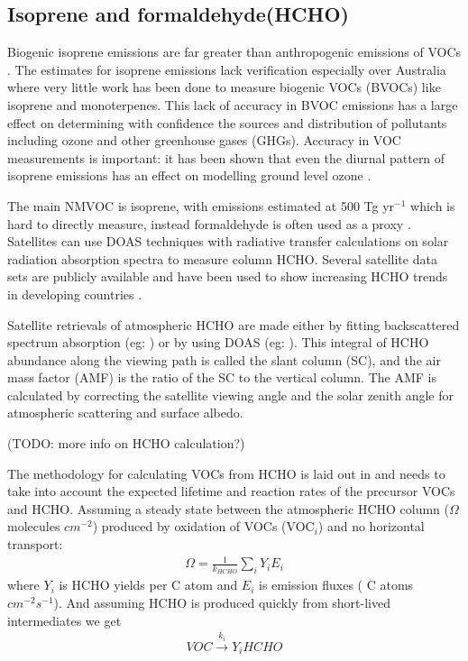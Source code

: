 \subsection{Isoprene and formaldehyde(HCHO)}

Biogenic isoprene emissions are far greater than anthropogenic emissions of VOCs \cite{Guenther_2006}. 
The estimates for isoprene emissions lack verification especially over Australia where very little work has been done to measure biogenic VOCs (BVOCs) like isoprene and monoterpenes.
This lack of accuracy in BVOC emissions has a large effect on determining with confidence the sources and distribution of pollutants including ozone and other greenhouse gases (GHGs).
Accuracy in VOC measurements is important: it has been shown that even the diurnal pattern of isoprene emissions has an effect on modelling ground level ozone \cite{Hewitt_2011}.

The main NMVOC is isoprene, with emissions estimated at 500 Tg yr$^{-1}$ \cite{Guenther_2006} which is hard to directly measure, instead formaldehyde is often used as a proxy \cite{Marais_2012,bauwens2013satellite}.
Satellites can use DOAS techniques with radiative transfer calculations on solar radiation absorption spectra to measure column HCHO.
Several satellite data sets are publicly available and have been used to show increasing HCHO trends in developing countries \cite{Mahajan_2015}.

Satellite retrievals of atmospheric HCHO are made either by fitting backscattered spectrum absorption (eg: \citet{Chance_2000}) or by using DOAS (eg: \citet{leue_2001}).
This integral of HCHO abundance along the viewing path is called the slant column (SC), and the air mass factor (AMF) is the ratio of the SC to the vertical column.
The AMF is calculated by correcting the satellite viewing angle and the solar zenith angle for atmospheric scattering and surface albedo.

(TODO: more info on HCHO calculation?)

The methodology for calculating VOCs from HCHO is laid out in \citet{Palmer_2003} and needs to take into account the expected lifetime and reaction rates of the precursor VOCs and HCHO.
Assuming a steady state between the atmospheric HCHO column ($\Omega$ molecules $cm^{-2}$)  produced by oxidation of VOCs (VOC$_i$) and no horizontal transport:
\begin{eqnarray*}
\Omega = \frac{1}{k_{HCHO}} \sum_{i} Y_i E_i
\end{eqnarray*}
where $Y_i$ is HCHO yields per C atom and $E_i$ is emission fluxes ( C atoms $cm^{-2}s^{-1}$).
And assuming HCHO is produced quickly from short-lived intermediates we get
\begin{eqnarray*}
VOC \overset{k_i}{\rightarrow} Y_i HCHO
\end{eqnarray*}

